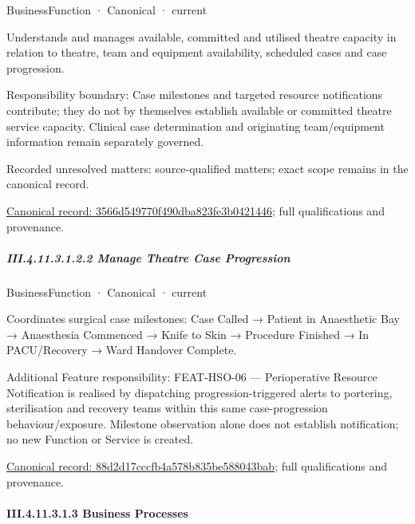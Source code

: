 \label{element:3566d549770f490dba823fe3b0421446}
{\small BusinessFunction · Canonical · current}\par

Understands and manages available, committed and utilised theatre capacity in relation to theatre, team and equipment availability, scheduled cases and case progression.



Responsibility boundary: Case milestones and targeted resource notifications contribute; they do not by themselves establish available or committed theatre service capacity. Clinical case determination and originating team/equipment information remain separately governed.


{\small Recorded unresolved matters: source-qualified matters; exact scope remains in the canonical record.}\par
{\footnotesize \href{../../../../../../../continuum/business/business-function/3566d549770f490dba823fe3b0421446.md}{Canonical record: 3566d549770f490dba823fe3b0421446}; full qualifications and provenance.}\par
\subparagraph*{III.4.11.3.1.2.2 Manage Theatre Case Progression}
\label{navigation:III.4.11.3.1.2.2}

\label{element:88d2d17cccfb4a578b835be588043bab}
{\small BusinessFunction · Canonical · current}\par

Coordinates surgical case milestones: Case Called → Patient in Anaesthetic Bay → Anaesthesia Commenced → Knife to Skin → Procedure Finished → In PACU/Recovery → Ward Handover Complete.



Additional Feature responsibility: FEAT-HSO-06 — Perioperative Resource Notification is realised by dispatching progression-triggered alerts to portering, sterilisation and recovery teams within this same case-progression behaviour/exposure. Milestone observation alone does not establish notification; no new Function or Service is created.


{\footnotesize \href{../../../../../../../continuum/business/business-function/88d2d17cccfb4a578b835be588043bab.md}{Canonical record: 88d2d17cccfb4a578b835be588043bab}; full qualifications and provenance.}\par
\paragraph*{III.4.11.3.1.3 Business Processes}
\label{navigation:III.4.11.3.1.3}

